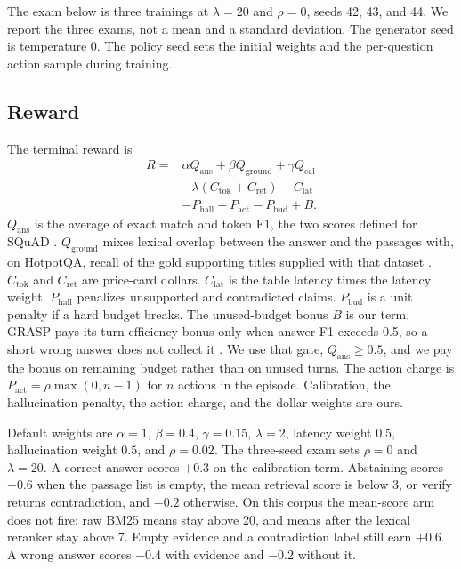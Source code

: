 \documentclass[letterpaper]{article} %
\begin{document}
The exam below is three trainings at \(\lambda{=}20\) and \(\rho{=}0\), seeds 42, 43, and 44. We report the three exams, not a mean and a standard deviation. The generator seed is temperature 0. The policy seed sets the initial weights and the per-question action sample during training.

\subsection{Reward}
The terminal reward is
\begin{equation}
\begin{aligned}
R = {} & \alpha Q_{\mathrm{ans}} + \beta Q_{\mathrm{ground}} + \gamma Q_{\mathrm{cal}} \\
& - \lambda (C_{\mathrm{tok}} + C_{\mathrm{ret}}) - C_{\mathrm{lat}} \\
& - P_{\mathrm{hall}} - P_{\mathrm{act}} - P_{\mathrm{bud}} + B.
\end{aligned}
\label{eq:reward}
\end{equation}
\(Q_{\mathrm{ans}}\) is the average of exact match and token F1, the two scores defined for SQuAD \cite{rajpurkar2016squad}. \(Q_{\mathrm{ground}}\) mixes lexical overlap between the answer and the passages with, on HotpotQA, recall of the gold supporting titles supplied with that dataset \cite{yang2018hotpotqa}. \(C_{\mathrm{tok}}\) and \(C_{\mathrm{ret}}\) are price-card dollars. \(C_{\mathrm{lat}}\) is the table latency times the latency weight. \(P_{\mathrm{hall}}\) penalizes unsupported and contradicted claims. \(P_{\mathrm{bud}}\) is a unit penalty if a hard budget breaks. The unused-budget bonus \(B\) is our term. GRASP pays its turn-efficiency bonus only when answer F1 exceeds 0.5, so a short wrong answer does not collect it \cite{gandhi2026grasp}. We use that gate, \(Q_{\mathrm{ans}} \ge 0.5\), and we pay the bonus on remaining budget rather than on unused turns. The action charge is \(P_{\mathrm{act}} = \rho \max(0, n-1)\) for \(n\) actions in the episode. Calibration, the hallucination penalty, the action charge, and the dollar weights are ours.

Default weights are \(\alpha{=}1\), \(\beta{=}0.4\), \(\gamma{=}0.15\), \(\lambda{=}2\), latency weight \(0.5\), hallucination weight \(0.5\), and \(\rho{=}0.02\). The three-seed exam sets \(\rho{=}0\) and \(\lambda{=}20\). A correct answer scores \(+0.3\) on the calibration term. Abstaining scores \(+0.6\) when the passage list is empty, the mean retrieval score is below 3, or verify returns contradiction, and \(-0.2\) otherwise. On this corpus the mean-score arm does not fire: raw BM25 means stay above 20, and means after the lexical reranker stay above 7. Empty evidence and a contradiction label still earn \(+0.6\). A wrong answer scores \(-0.4\) with evidence and \(-0.2\) without it.
\end{document}

